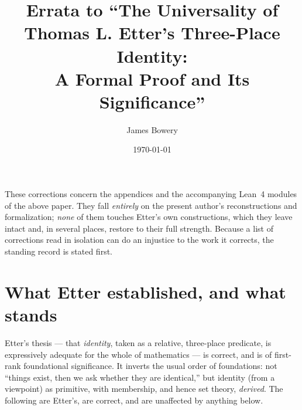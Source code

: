 \documentclass[11pt]{article}
\title{Errata to ``The Universality of Thomas L. Etter's Three-Place Identity:\\
A Formal Proof and Its Significance''}
\author{James Bowery}
\date{\today}
\begin{document}
\maketitle

These corrections concern the appendices and the accompanying Lean~4 modules of the above
paper. They fall \emph{entirely} on the present author's reconstructions and formalization;
\emph{none} of them touches Etter's own constructions, which they leave intact and, in
several places, restore to their full strength. Because a list of corrections read in
isolation can do an injustice to the work it corrects, the standing record is stated first.

\section{What Etter established, and what stands}

Etter's thesis --- that \emph{identity}, taken as a relative, three-place predicate, is
expressively adequate for the whole of mathematics --- is correct, and is of first-rank
foundational significance. It inverts the usual order of foundations: not ``things exist,
then we ask whether they are identical,'' but identity (from a viewpoint) as primitive, with
membership, and hence set theory, \emph{derived}. The following are Etter's, are correct, and
are unaffected by anything below.
\end{document}

